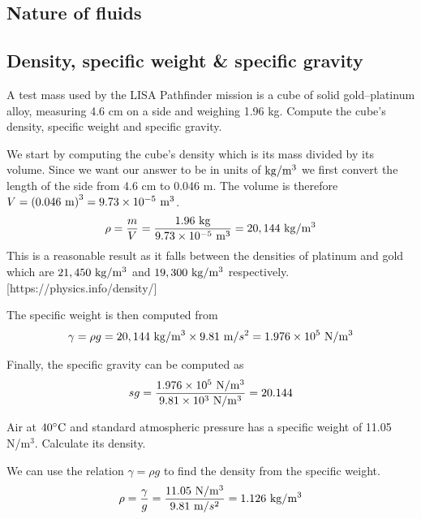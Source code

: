 \documentclass[multi,preview,varwidth=false,border=5,12pt]{standalone}
\begin{document}
\begin{center}
\section*{Nature of fluids}
\end{center}

\subsection*{Density, specific weight \& specific gravity}

\begin{question}
A test mass used by the LISA Pathfinder mission is a cube of solid gold--platinum alloy, measuring 4.6 cm on a side and weighing 1.96 kg.  Compute the cube's density, specific weight and specific gravity.

\begin{solution}
  We start by computing the cube's density which is its mass divided by its volume.  Since we want our answer to be in units of $\mathrm{kg}/\mathrm{m}^3$ we first convert the length of the side from 4.6 cm to 0.046 m.  The volume is therefore $V=\left(0.046~\mathrm{m}\right)^3=9.73\times 10^{-5}~\mathrm{m}^3$.
  \begin{align*}
  \rho=\frac{m}{V}=\frac{1.96~\mathrm{kg}}{9.73\times 10^{-5}~\mathrm{m}^3}=20,144~\mathrm{kg}/\mathrm{m}^3
  \end{align*}
  This is a reasonable result as it falls between the densities of platinum and gold which are $21,450~\mathrm{kg}/\mathrm{m}^3$ and  $19,300~\mathrm{kg}/\mathrm{m}^3$ respectively. [https://physics.info/density/]

  The specific weight is then computed from
  \begin{align*}
  \gamma=\rho g=20,144~\mathrm{kg}/\mathrm{m}^3\times 9.81~\mathrm{m}/s^2=1.976\times 10^5~\mathrm{N}/\mathrm{m}^3
  \end{align*}

  Finally, the specific gravity can be computed as
  \begin{align*}
  sg=\frac{1.976\times 10^5~\mathrm{N}/\mathrm{m}^3}{9.81\times 10^3~\mathrm{N}/\mathrm{m}^3}=20.144
  \end{align*}
\end{solution}
\end{question}


\begin{question}
Air at $40^\circ\mathrm{C}$ and standard atmospheric pressure has a specific weight of 11.05 N/m$^3$.
Calculate its density.

\begin{solution}
  We can use the relation $\gamma=\rho g$ to find the density from the specific weight.
  \begin{align*}
      \rho=\frac{\gamma}{g}=\frac{11.05~\mathrm{N}/\mathrm{m}^3}{9.81~\mathrm{m}/s^2}=1.126~\mathrm{kg}/\mathrm{m}^3
  \end{align*}
\end{solution}

\end{question}
\end{document}
